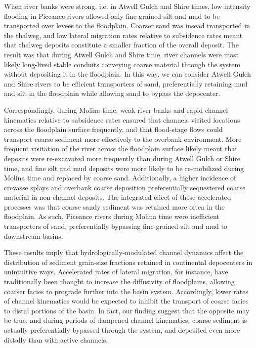 \documentclass[draft]{compact_proposal}
\begin{document}
When river banks were strong, i.e. in Atwell Gulch and Shire times, low intensity flooding in Piceance rivers allowed only fine-grained silt and mud to be transported over levees to the floodplain.
Coarser sand was insead transported in the thalweg, and low lateral migration rates relative to subsidence rates meant that thalweg deposits constitute a smaller fraction of the overall deposit.
The result was that during Atwell Gulch and Shire time, river channels were most likely long-lived stable conduits conveying coarse material through the system without depositing it in the floodplain.
In this way, we can consider Atwell Gulch and Shire rivers to be efficient transporters of sand, preferentially retaining mud and silt in the floodplain while allowing sand to bypass the depocenter.

Correspondingly, during Molina time, weak river banks and rapid channel kinematics relative to subsidence rates ensured that channels visited locations across the floodplain surface frequently, and that flood-stage flows could transport coarse sediment more effectively to the overbank environment.
More frequent visitation of the river across the floodplain surface likely meant that deposits were re-excavated more frequently than during Atwell Gulch or Shire time, and fine silt and mud deposits were more likely to be re-mobilized during Molina time and replaced by coarse sand.
Additionally, a higher incidence of crevasse splays and overbank coarse deposition preferentially sequestered coarse material in non-channel deposits.
The integrated effect of these accelerated processes was that coarse sandy sediment was retained more often in the floodplain.
As such, Piceance rivers during Molina time were inefficient transporters of sand, preferentially bypassing fine-grained silt and mud to downstream basins.

These results imply that hydrologically-modulated channel dynamics affect the distribution of sediment grain-size fractions retained in continental depocenters in unintuitive ways.
Accelerated rates of lateral migration, for instance, have traditionally been thought to increase the diffusivity of floodplains, allowing coarser facies to prograde further into the basin system.
Accordingly, lower rates of channel kinematics would be expected to inhibit the transport of coarse facies to distal portions of the basin.
In fact, our finding suggest that the opposite may be true, and during periods of dampened channel kinematics, coarse sediment is actually preferentially bypassed through the system, and deposited even more distally than with active channels.
\end{document}
